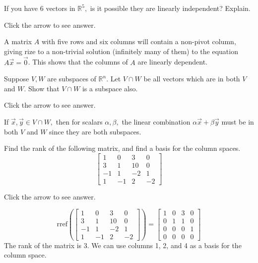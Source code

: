 \documentclass{ximera}
\begin{document}
\begin{problem}\label{prb:5.25} If you have $6$ vectors in $\mathbb{R}^{5},$ is it possible they are
linearly independent? Explain.

Click the arrow to see answer.  
\begin{expandable}
A matrix $A$ with five rows and six columns will contain a non-pivot column, giving rize to a non-trivial solution (infinitely many of them) to the equation $A\vec{x}=\vec{0}$.  This shows that the columns of $A$ are linearly dependent.
\end{expandable}
\end{problem}

\begin{problem}\label{prb:5.27} Suppose $V, W$ are subspaces of $\mathbb{R}^{n}.$ Let $V\cap W$
be all vectors which are in both $V$ and $W$. Show that $V \cap W$ is a subspace also.

Click the arrow to see answer.  
\begin{expandable}
If $\vec{x}, \vec{y}\in V\cap W,$ then for scalars $\alpha
,\beta ,$ the linear combination $\alpha \vec{x}+\beta \vec{y}$ must
be in both $V$ and $W$ since they are both subspaces.
\end{expandable}
\end{problem}

\begin{problem}\label{prb:5.37} Find the rank of the following matrix, and find a basis for the column spaces.
\begin{equation*}
\left[
\begin{array}{rrrr}
1 & 0 & 3 & 0 \\
3 & 1 & 10 & 0 \\
-1 & 1 & -2 & 1 \\
1 & -1 & 2 & -2
\end{array}
\right]
\end{equation*}

Click the arrow to see answer.  

\begin{expandable}
$$\text{rref}\left(\begin{bmatrix}
1 & 0 & 3 & 0 \\
3 & 1 & 10 & 0 \\
-1 & 1 & -2 & 1 \\
1 & -1 & 2 & -2
\end{bmatrix}\right)=\begin{bmatrix}1 &0 &3 &0\\
 0& 1& 1& 0\\
 0& 0& 0& 1\\
 0& 0& 0& 0\end{bmatrix}$$
 The rank of the matrix is 3.  We can use columns 1, 2, and 4 as a basis for the column space.
\end{expandable}
\end{problem}
\end{document}
